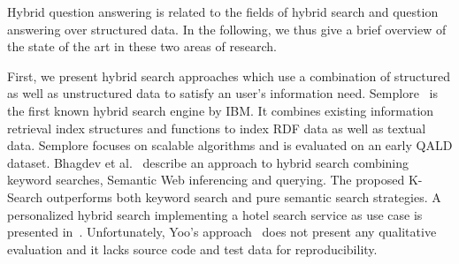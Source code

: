 Hybrid question answering is related to the fields of hybrid search and question answering over structured data. In the following, we thus give a brief overview of the state of the art in these two areas of research.

First, we present hybrid search approaches which use a combination of structured as well as unstructured data to satisfy an user's information need. 
Semplore~\cite{Zhang:2007a} is the first known hybrid search engine by IBM.
It combines existing information retrieval index structures and functions to index RDF data as well as textual data. 
Semplore focuses on scalable algorithms and is evaluated on an early QALD dataset.
Bhagdev et al.~\cite{Bhagdev:2008:HSE} describe an approach to hybrid search combining keyword searches, Semantic Web inferencing and querying. 
The proposed K-Search outperforms both keyword search and pure semantic search strategies.
A personalized hybrid search implementing a  hotel search service as use case is presented in~\cite{DBLP:journals/kbs/Yoo12}. 
Unfortunately, Yoo's approach~\cite{DBLP:journals/kbs/Yoo12} does not present any qualitative evaluation and it lacks source code and test data for reproducibility. 


